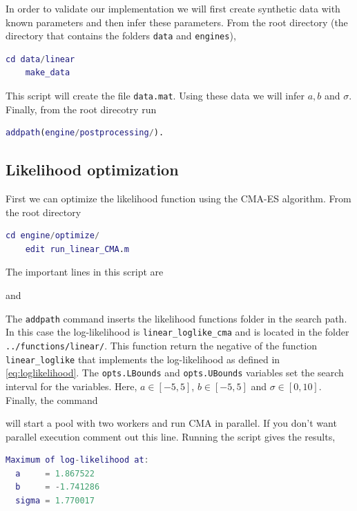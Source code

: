 \documentclass{article}
\begin{document}
In order to validate our implementation we will first create synthetic data with known parameters and then infer these parameters. From the root directory (the directory that contains the folders \verb|data| and \verb|engines|), 
%
\begin{lstlisting}[language=Matlab]
	cd data/linear
	make_data
\end{lstlisting}
%
This script will create the file \texttt{data.mat}. Using these data we will infer $a,b$ and $\sigma$.
%
Finally, from the root direcotry run
%
\begin{lstlisting}[language=Matlab]
	addpath(engine/postprocessing/).
\end{lstlisting}







\subsection{Likelihood optimization}
First we can optimize the likelihood function using the CMA-ES algorithm. From the root directory
%
\begin{lstlisting}[language=Matlab]
	cd engine/optimize/
	edit run_linear_CMA.m
\end{lstlisting}
%
%
The important lines in this script are
%

%
and
%

%
The \texttt{addpath} command inserts the likelihood functions folder in the search path. In this case the log-likelihood is \verb|linear_loglike_cma| and is located in the folder \verb|../functions/linear/|. This function return the negative of the function \verb|linear_loglike| that implements the log-likelihood as defined in \cref{eq:loglikelihood}.
%
The \texttt{opts.LBounds} and \texttt{opts.UBounds} variables set the search interval for the variables. Here, $a\in[-5,5]$, $b\in[-5,5]$ and $\sigma\in[0,10]$.
Finally, the command
%
%

%
will start a pool with two workers and run CMA in parallel. If you don't want parallel execution comment out this line. Running the script gives the results,
%
\begin{lstlisting}[language=Matlab]
 Maximum of log-likelihood at:
  a     = 1.867522 
  b     = -1.741286 
  sigma = 1.770017 
\end{lstlisting}
\end{document}
